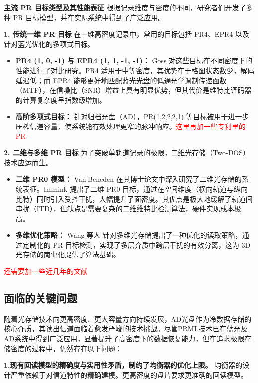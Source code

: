 \textbf{主流 PR 目标类型及其性能表征}
根据记录维度与密度的不同，研究者们开发了多种 PR 目标模型，并在实际系统中得到了广泛应用。

\textbf{1. 传统一维 PR 目标}
在一维高密度记录中，常用的目标包括 PR4、EPR4 以及针对蓝光优化的多项式目标。
\begin{itemize}
	\item \textbf{PR4 (1, 0, -1) 与 EPR4 (1, 1, -1, -1)：} Goss \cite{goss2006detection} 对这些目标在不同密度下的性能进行了对比研究。PR4 适用于中等密度，其优势在于格图状态数少，解码延迟低；而 EPR4 能够更好地匹配蓝光光盘的低通光学调制传递函数（MTF），在信噪比（SNR）增益上具有明显优势，但其代价是维特比译码器的计算复杂度呈指数级增加。
	\item \textbf{高阶多项式目标：} 针对归档光盘（AD），PR(1,2,2,2,1) 等目标被用于进一步压榨信道容量，使系统能有效处理更窄的脉冲响应。\textcolor{red}{这里再加一些专利里的PR}
\end{itemize}

\textbf{2. 二维与多维 PR 目标}
为了突破单轨道记录的极限，二维光存储（Two-DOS）技术应运而生。
\begin{itemize}
	\item \textbf{二维 PR0 模型：} Van Beneden \cite{van2008system} 在其博士论文中深入研究了二维光存储的系统表征。Immink \cite{immink2003signal} 提出了二维 PR0 目标，通过在空间维度（横向轨道与纵向比特）同时引入受控干扰，大幅提升了面密度。其优点是极大地缓解了轨道间串扰（ITD），但缺点是需要复杂的二维维特比检测算法，硬件实现成本极高。
	\item \textbf{多维优化策略：} Wang 等人 \cite{wang2014optimized} 针对多维光存储提出了一种优化的读取策略，通过定制化的 PR 目标检测，实现了多层介质中跨层干扰的有效分离，这为 3D 光存储的商业化提供了算法基础。
\end{itemize}

\textcolor{red}{还需要加一些近几年的文献}

\subsection{面临的关键问题}

随着光存储技术向更高密度、更大容量方向持续发展，AD光盘作为冷数据存储的核心介质，其读出信道面临着愈发严峻的技术挑战。尽管PRML技术已在蓝光及AD系统中得到广泛应用，显著提升了高密度下的数据恢复能力，但在追求极限存储密度的过程中，仍然存在以下问题：

\textbf{1.现有回读模型的精确度与实用性矛盾，制约了均衡器的优化上限。} 均衡器的设计严重依赖于对信道特性的精确建模。更高密度的盘片要求更准确的回读模型。

